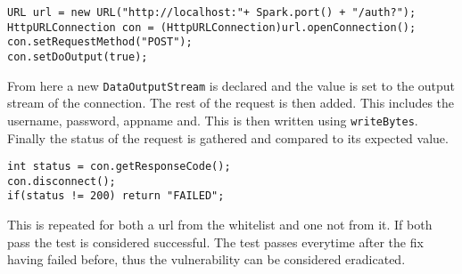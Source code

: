 \begin{verbatim}
URL url = new URL("http://localhost:"+ Spark.port() + "/auth?");
HttpURLConnection con = (HttpURLConnection)url.openConnection();
con.setRequestMethod("POST");
con.setDoOutput(true);
\end{verbatim}
From here a new \verb|DataOutputStream| is declared and the value is set to the output stream of the connection. The rest of the request is then added. This includes the username, password,
appname and. This is then written using \verb|writeBytes|. Finally the status of the request is gathered and compared to its expected value.
\begin{verbatim}
int status = con.getResponseCode();
con.disconnect();
if(status != 200) return "FAILED";
\end{verbatim}
This is repeated for both a url from the whitelist and one not from it. If both pass the test is considered successful. The test passes everytime after the fix having failed before, thus
the vulnerability can be considered eradicated.\\ \\



